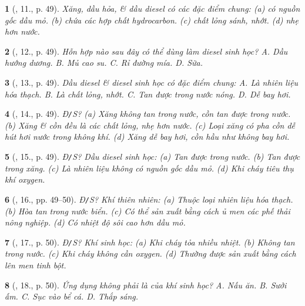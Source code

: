 \documentclass{article}
\newtheorem{baitoan}{}
\begin{document}
\begin{baitoan}[\cite{ncpt_KHTN_6_tap_1}, 11., p. 49]
	Xăng, dầu hỏa, \& dầu diesel có các đặc điểm chung: (a) có nguồn gốc dầu mỏ. (b) chứa các hợp chất hydrocarbon. (c) chất lỏng sánh, nhớt. (d) nhẹ hơn nước.
\end{baitoan}

\begin{baitoan}[\cite{ncpt_KHTN_6_tap_1}, 12., p. 49]
	Hỗn hợp nào sau đây có thể dùng làm diesel sinh học? {\sf A.} Dầu hướng dương. {\sf B.} Mủ cao su. {\sf C.} Rỉ đường mía. {\sf D.} Sữa.
\end{baitoan}

\begin{baitoan}[\cite{ncpt_KHTN_6_tap_1}, 13., p. 49]
	Dầu diesel \& diesel sinh học có đặc điểm chung: {\sf A.} Là nhiên liệu hóa thạch. {\sf B.} Là chất lỏng, nhớt. {\sf C.} Tan được trong nước nóng. {\sf D.} Dễ bay hơi.
\end{baitoan}

\begin{baitoan}[\cite{ncpt_KHTN_6_tap_1}, 14., p. 49]
	{\rm Đ{\tt/}S?} (a) Xăng không tan trong nước, cồn tan được trong nước. (b) Xăng \& cồn đều là các chất lỏng, nhẹ hơn nước. (c) Loại xăng có pha cồn dễ hút hơi nước trong không khí. (d) Xăng dễ bay hơi, cồn hầu như không bay hơi.
\end{baitoan}

\begin{baitoan}[\cite{ncpt_KHTN_6_tap_1}, 15., p. 49]
	{\rm Đ{\tt/}S?} Dầu diesel sinh học: (a) Tan được trong nước. (b) Tan được trong xăng. (c) Là nhiên liệu không có nguồn gốc dầu mỏ. (d) Khi cháy tiêu thụ khí oxygen.
\end{baitoan}

\begin{baitoan}[\cite{ncpt_KHTN_6_tap_1}, 16., pp. 49--50]
	{\rm Đ{\tt/}S?} Khí thiên nhiên: (a) Thuộc loại nhiên liệu hóa thạch. (b) Hòa tan trong nước biển. (c) Có thể sản xuất bằng cách ủ men các phế thải nông nghiệp. (d) Có nhiệt độ sôi cao hơn dầu mỏ.
\end{baitoan}

\begin{baitoan}[\cite{ncpt_KHTN_6_tap_1}, 17., p. 50]
	{\rm Đ{\tt/}S?} Khí sinh học: (a) Khi cháy tỏa nhiều nhiệt. (b) Không tan trong nước. (c) Khi cháy không cần oxygen. (d) Thường được sản xuất bằng cách lên men tinh bột.
\end{baitoan}

\begin{baitoan}[\cite{ncpt_KHTN_6_tap_1}, 18., p. 50]
	Ứng dụng không phải là của khí sinh học? {\sf A.} Nấu ăn. {\sf B.} Sưởi ấm. {\sf C.} Sục vào bể cá. {\sf D.} Thắp sáng.
\end{baitoan}
\end{document}
